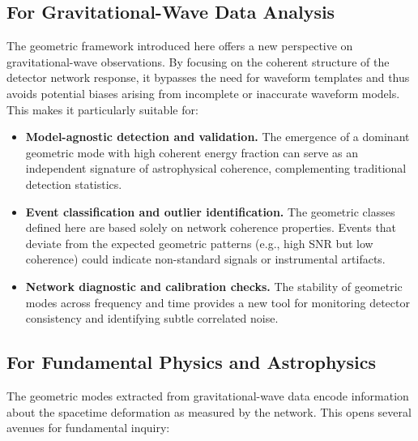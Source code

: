 \documentclass[11pt,a4paper]{article}
\begin{document}
\subsection{For Gravitational-Wave Data Analysis}
The geometric framework introduced here offers a new perspective on gravitational-wave observations. By focusing on the coherent structure of the detector network response, it bypasses the need for waveform templates and thus avoids potential biases arising from incomplete or inaccurate waveform models. This makes it particularly suitable for:

\begin{itemize}
    \item \textbf{Model-agnostic detection and validation.} The emergence of a dominant geometric mode with high coherent energy fraction can serve as an independent signature of astrophysical coherence, complementing traditional detection statistics.

    \item \textbf{Event classification and outlier identification.} The geometric classes defined here are based solely on network coherence properties. Events that deviate from the expected geometric patterns (e.g., high SNR but low coherence) could indicate non-standard signals or instrumental artifacts.

    \item \textbf{Network diagnostic and calibration checks.} The stability of geometric modes across frequency and time provides a new tool for monitoring detector consistency and identifying subtle correlated noise.
\end{itemize}

\subsection{For Fundamental Physics and Astrophysics}
The geometric modes extracted from gravitational-wave data encode information about the spacetime deformation as measured by the network. This opens several avenues for fundamental inquiry:
\end{document}
